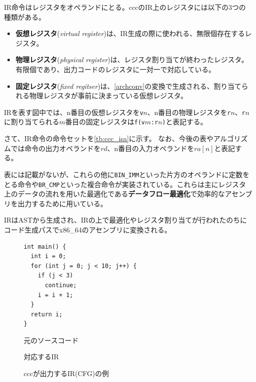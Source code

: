 \documentclass[uplatex,a4paper]{jsarticle}
\begin{document}
IR命令はレジスタをオペランドにとる。cccのIR上のレジスタには以下の3つの種類がある。
\begin{itemize}
  \item \textbf{仮想レジスタ}(\textit{virtual register})は、IR生成の際に使われる、無限個存在するレジスタ。
  \item \textbf{物理レジスタ}(\textit{physical register})は、レジスタ割り当てが終わったレジスタ。有限個であり、出力コードのレジスタに一対一で対応している。
  \item \textbf{固定レジスタ}(\textit{fixed regitser})は、\cref{archconv}の変換で生成される、割り当てられる物理レジスタが事前に決まっている仮想レジスタ。
\end{itemize}

IRを表す図中では、n番目の仮想レジスタを\texttt{v}$n$、n番目の物理レジスタを\texttt{r}$n$、\texttt{r}$n$に割り当てられる$m$番目の固定レジスタは\texttt{f(v$m$:r$n$)}と表記する。

さて、IR命令の命令セットを\cref{tb:ccc_isa}に示す。
なお、今後の表やアルゴリズムでは命令の出力オペランドを$rd$、n番目の入力オペランドを$ra[n]$と表記する。

表には記載がないが、これらの他に\texttt{BIN\_IMM}といった片方のオペランドに定数をとる命令や\texttt{BR\_CMP}といった複合命令が実装されている。これらは主にレジスタ上のデータの流れを用いた最適化である\textbf{データフロー最適化}で効率的なアセンブリを出力するために用いている。

IRはASTから生成され、IRの上で最適化やレジスタ割り当てが行われたのちにコード生成パスでx86\_64のアセンブリに変換される。

\begin{figure}[hb]
  \begin{minipage}{0.50\hsize}
    \centering
    \begin{verbatim}
int main() {
  int i = 0;
  for (int j = 0; j < 10; j++) {
    if (j < 3)
      continue;
    i = i + 1;
  }
  return i;
}
    \end{verbatim}
    \caption*{元のソースコード}
  \end{minipage}
  \begin{minipage}{0.50\hsize}
    \centering
    
    \caption*{対応するIR}
  \end{minipage}
  \caption{cccが出力するIR(CFG)の例}
  \label{ccc_cfg_fig}
\end{figure}
\end{document}
